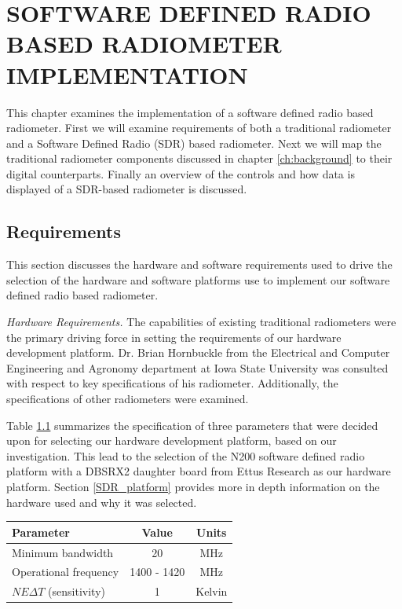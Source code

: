 \chapter{SOFTWARE DEFINED RADIO BASED RADIOMETER IMPLEMENTATION}\label{ch:implementation}

This chapter examines the implementation of a software defined radio based radiometer.  First we will examine requirements of both a traditional radiometer and a Software Defined Radio (SDR) based radiometer.  Next we will map the traditional radiometer components discussed in chapter \ref{ch:background} to their digital counterparts.  Finally an overview of the controls and how data is displayed of a SDR-based radiometer is discussed.

\section{Requirements}\label{requirements}

This section discusses the hardware and software requirements used to drive the selection of the hardware and software platforms use to implement our software defined radio based radiometer.  

\emph{Hardware Requirements.}  The capabilities of existing traditional radiometers were the primary driving force in setting the requirements of our hardware development platform.  Dr. Brian Hornbuckle from the Electrical and Computer Engineering and Agronomy department at Iowa State University was consulted with respect to key specifications of his radiometer.  Additionally, the specifications of other radiometers were examined. 

Table \ref{rad_performance} summarizes the specification of three parameters that were decided upon for selecting our hardware development platform, based on our investigation.  This lead to the selection of the N200 software defined radio platform with a DBSRX2 daughter board from Ettus Research as our hardware platform.  Section \ref{SDR_platform} provides more in depth information on the hardware used and why it was selected.

\begin{table}[h!tb] \centering
{}
\label{rad_performance}
\begin{tabular}{lcc} \hline
\textbf{Parameter} & \textbf{Value} & \textbf{Units} \\ \hline
Minimum bandwidth & 20 & MHz \\
Operational frequency & 1400 - 1420 & MHz \\
$NE\Delta T$ (sensitivity) & 1 & Kelvin \\ \hline
\end{tabular}
\end{table}

